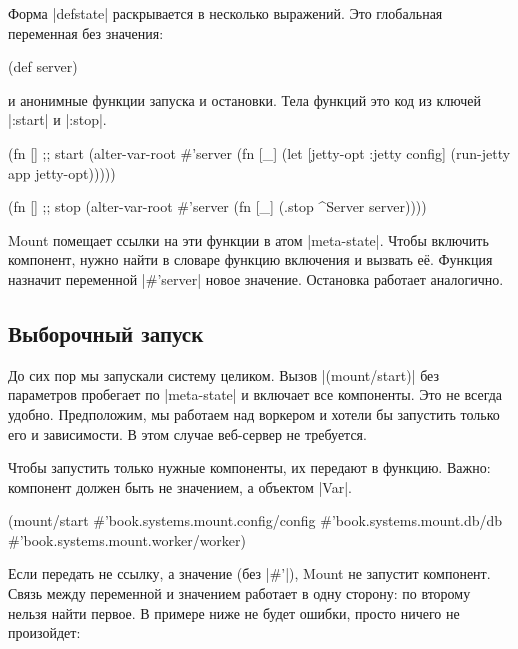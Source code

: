 Форма \spverb|defstate| раскрывается в несколько выражений. Это глобальная
переменная без значения:

\begin{english}
  \begin{clojure}
(def server)
  \end{clojure}
\end{english}

\noindent
и анонимные функции запуска и остановки. Тела функций это код из ключей
\spverb|:start| и \spverb|:stop|.

\begin{english}
  \begin{clojure}
(fn [] ;; start
  (alter-var-root #'server
   (fn [_]
     (let [{jetty-opt :jetty} config]
       (run-jetty app jetty-opt)))))

(fn [] ;; stop
  (alter-var-root #'server
   (fn [_]
     (.stop ^Server server))))
  \end{clojure}
\end{english}

Mount помещает ссылки на эти функции в атом \spverb|meta-state|. Чтобы включить
компонент, нужно найти в словаре функцию включения и вызвать е\"{е}. Функция
назначит переменной \spverb|#'server| новое значение. Остановка работает
аналогично.

\subsection{Выборочный запуск}

До сих пор мы запускали систему целиком. Вызов \spverb|(mount/start)| без
параметров пробегает по \spverb|meta-state| и включает все компоненты. Это не
всегда удобно. Предположим, мы работаем над воркером и хотели бы запустить
только его и зависимости. В этом случае веб-сервер не требуется.

Чтобы запустить только нужные компоненты, их передают в функцию. Важно:
компонент должен быть не значением, а объектом \spverb|Var|.

\begin{english}
  \begin{clojure}
(mount/start
  #'book.systems.mount.config/config
  #'book.systems.mount.db/db
  #'book.systems.mount.worker/worker)
  \end{clojure}
\end{english}

Если передать не ссылку, а значение (без \spverb|#'|), Mount не запустит
компонент. Связь между переменной и значением работает в одну сторону: по
второму нельзя найти первое. В примере ниже не будет ошибки, просто ничего не
произойдет:

